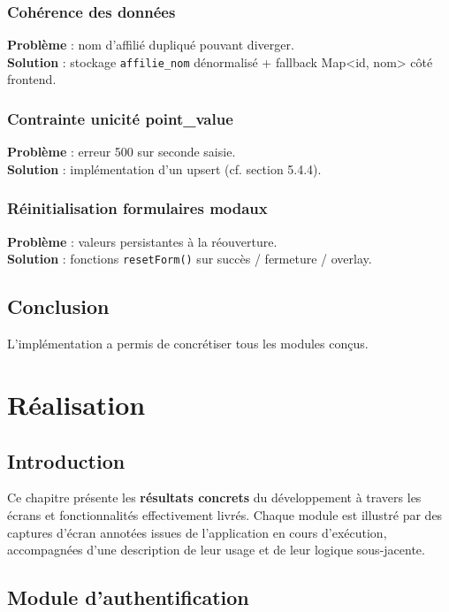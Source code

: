 \documentclass[12pt,a4paper,oneside]{report}
\begin{document}
\subsection{Cohérence des données}
\textbf{Problème} : nom d'affilié dupliqué pouvant diverger. \\
\textbf{Solution} : stockage \texttt{affilie\_nom} dénormalisé + fallback Map\textless id, nom\textgreater{} côté frontend.

\subsection{Contrainte unicité point\_value}
\textbf{Problème} : erreur 500 sur seconde saisie. \\
\textbf{Solution} : implémentation d'un upsert (cf. section 5.4.4).

\subsection{Réinitialisation formulaires modaux}
\textbf{Problème} : valeurs persistantes à la réouverture. \\
\textbf{Solution} : fonctions \texttt{resetForm()} sur succès / fermeture / overlay.

\section{Conclusion}
L'implémentation a permis de concrétiser tous les modules conçus.

\chapter{Réalisation}

\section{Introduction}
Ce chapitre présente les \textbf{résultats concrets} du développement à travers les écrans et fonctionnalités effectivement livrés. Chaque module est illustré par des captures d'écran annotées issues de l'application en cours d'exécution, accompagnées d'une description de leur usage et de leur logique sous-jacente.

\section{Module d'authentification}
\end{document}
